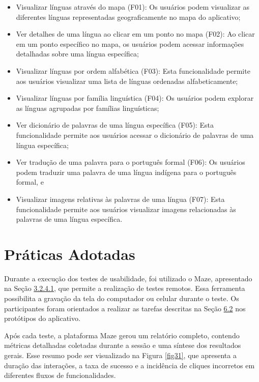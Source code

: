 \begin{itemize}

	\item Visualizar línguas através do mapa (F01): Os usuários podem visualizar as diferentes línguas representadas geograficamente no mapa do aplicativo;

    \item Ver detalhes de uma língua ao clicar em um ponto no mapa (F02): Ao clicar em um ponto específico no mapa, os usuários podem acessar informações detalhadas sobre uma língua específica;
    
    \item Visualizar línguas por ordem alfabética (F03): Esta funcionalidade permite aos usuários visualizar uma lista de línguas ordenadas alfabeticamente;
    
    \item Visualizar línguas por família linguística (F04): Os usuários podem explorar as línguas agrupadas por famílias linguísticas;
    
    \item Ver dicionário de palavras de uma língua específica (F05): Esta funcionalidade permite aos usuários acessar o dicionário de palavras de uma língua específica;
    
    \item Ver tradução de uma palavra para o português formal (F06): Os usuários podem traduzir uma palavra de uma língua indígena para o português formal, e
    
    \item  Visualizar imagens relativas às palavras de uma língua (F07): Esta funcionalidade permite aos usuários visualizar imagens relacionadas às palavras de uma língua específica.

\end{itemize}

\section{Práticas Adotadas}
\label{sec:Práticas Adotadas}
Durante a execução dos testes de usabilidade, foi utilizado o Maze, apresentado na Seção \hyperref[{sec:Maze}]{3.2.4.1}, que permite a realização de testes remotos. Essa ferramenta possibilita a gravação da tela do computador ou celular 
durante o teste. Os participantes foram orientados a realizar as tarefas descritas na Seção \hyperref[sec:Cenários de Uso]{6.2} nos protótipos do aplicativo.

Após cada teste, a plataforma Maze gerou um relatório completo, contendo métricas detalhadas coletadas durante a sessão e uma síntese dos resultados gerais. Esse resumo pode ser visualizado na Figura \ref{fig31}, que apresenta a duração das interações, a taxa de sucesso e 
a incidência de cliques incorretos em diferentes fluxos de funcionalidades.

